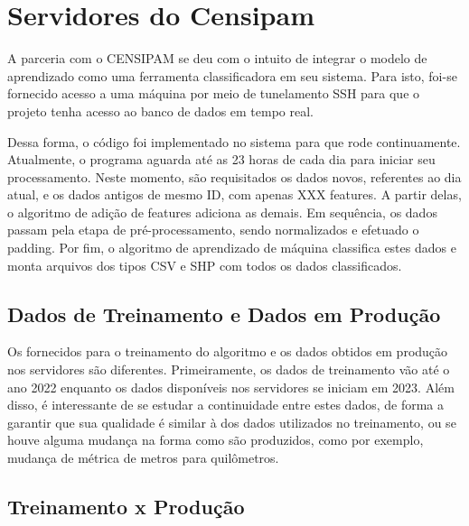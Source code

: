 \section{Servidores do Censipam}

A parceria com o CENSIPAM se deu com o intuito de integrar o modelo de aprendizado como uma ferramenta classificadora em seu sistema. Para isto, foi-se fornecido acesso a uma máquina por meio de tunelamento SSH para que o projeto tenha acesso ao banco de  dados em tempo real.

Dessa forma, o código foi implementado no sistema para que rode continuamente. Atualmente, o programa aguarda até as 23 horas de cada dia para iniciar seu processamento. Neste momento, são requisitados os dados novos, referentes ao dia atual, e os dados antigos de mesmo ID, com apenas XXX features. A partir delas, o algoritmo de adição de features adiciona as demais. Em sequência, os dados passam pela etapa de pré-processamento, sendo normalizados e efetuado o padding. Por fim, o algoritmo de aprendizado de máquina classifica estes dados e monta arquivos dos tipos CSV e SHP com todos os dados classificados.

\subsection{Dados de Treinamento e Dados em Produção}
Os fornecidos para o treinamento do algoritmo e os dados obtidos em produção nos servidores são diferentes. Primeiramente, os dados de treinamento vão até o ano 2022 enquanto os dados disponíveis nos servidores se iniciam em 2023. Além disso, é interessante de se estudar a continuidade entre estes dados, de forma a garantir que sua qualidade é similar à dos dados utilizados no treinamento, ou se houve alguma mudança na forma como são produzidos, como por exemplo, mudança de métrica de metros para quilômetros.


\subsection{Treinamento x Produção}
\subsection{}




